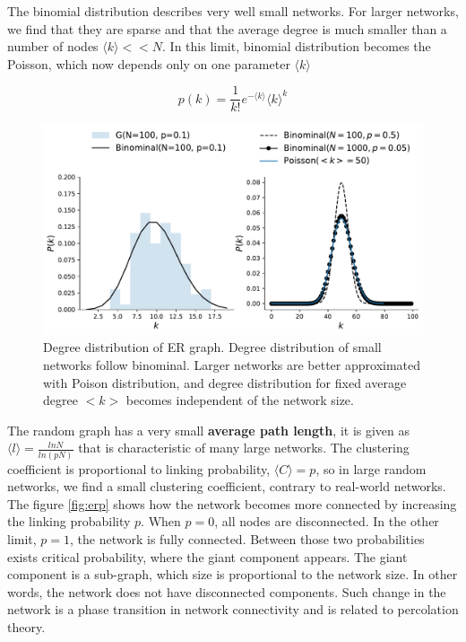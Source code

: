 The binomial distribution describes very well small networks. For larger networks, we find that they are sparse and that the average degree is much smaller than a number of nodes $\langle k \rangle << N$. In this limit, binomial distribution becomes the Poisson, which now depends only on one parameter $\langle k \rangle$

\begin{equation}
p(k) = \frac{1}{k!}e^{-\langle k \rangle}\langle k \rangle^{k}
\end{equation}

\begin{figure}[h!]
	\centering
	\includegraphics[width=0.9\linewidth]{figures/methodology/ER_dist}
	\caption{Degree distribution of ER graph. Degree distribution of small networks follow binominal. Larger networks are better approximated with Poison distribution, and degree distribution for fixed average degree $<k>$ becomes independent of the network size.}
	\label{fig:erdist}
\end{figure}

The random graph has a very small \textbf{average path length}, it is given as $\langle l \rangle = \frac{ln N}{ln(pN)}$ that is characteristic of many large networks. The clustering coefficient is proportional to linking probability, $\langle C \rangle = p$, so in large random networks, we find a small clustering coefficient, contrary to real-world networks. \\  %

The figure \ref{fig:erp} shows how the network becomes more connected by increasing the linking probability $p$. When $p=0$, all nodes are disconnected. In the other limit, $p=1$, the network is fully connected. Between those two probabilities exists critical probability, where the giant component appears. The giant component is a sub-graph, which size is proportional to the network size. In other words, the network does not have disconnected components. Such change in the network is a phase transition in network connectivity and is related to percolation theory. \\

